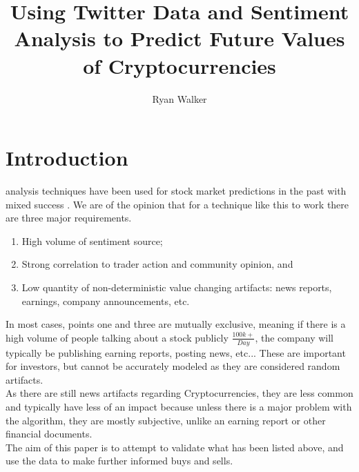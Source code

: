 \documentclass[12pt,journal,compsoc]{IEEEtran}
\begin{document}
\title{Using Twitter Data and Sentiment Analysis to Predict Future Values of Cryptocurrencies}

\author{Ryan Walker}


\maketitle
\IEEEpeerreviewmaketitle

\section{Introduction}
 analysis techniques have been used for stock market predictions in the past  with 
mixed success \cite{BI1}. We are of the opinion that for a technique like this to work there are three major requirements.

\begin{enumerate}
\item High volume of sentiment source;
\item Strong correlation to trader action and community opinion, and
\item Low quantity of non-deterministic value changing artifacts: news reports, earnings, company announcements, etc.
\end{enumerate}

In most cases, points one and three are mutually exclusive, meaning if there is a high volume of people talking about a
stock publicly $\frac{100k+}{Day}$, the company will typically be publishing earning reports, posting news, etc... 
These are important for investors, but cannot be accurately modeled as they are considered random artifacts.\\

As there are still news artifacts regarding Cryptocurrencies, they are less common and typically 
have less of an impact because unless there is a major problem with the algorithm, they are mostly subjective, unlike 
an earning report or other financial documents.\\

The aim of this paper is to attempt to validate what has been listed above, and use the data to make further informed 
buys and sells.
\end{document}
